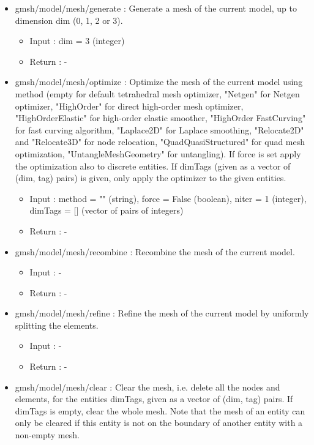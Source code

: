 \documentclass[dvipdfmx, 9pt, a4paper]{article}
\numberwithin{equation}{section}
\begin{document}
\begin{itemize}
\item gmsh/model/mesh/generate : Generate a mesh of the current model, up to dimension dim (0, 1, 2 or 3).
\begin{itemize}
\item Input : dim = 3 (integer)
\item Return : -
\end{itemize}
\item gmsh/model/mesh/optimize : Optimize the mesh of the current model using method (empty for default tetrahedral mesh optimizer, "Netgen" for Netgen optimizer, "HighOrder" for direct high-order mesh optimizer, "HighOrderElastic" for high-order elastic smoother, "HighOrder FastCurving" for fast curving algorithm, "Laplace2D" for Laplace smoothing, "Relocate2D" and "Relocate3D" for node relocation, "QuadQuasiStructured" for quad mesh optimization, "UntangleMeshGeometry" for untangling). If force is set apply the optimization also to discrete entities. If dimTags (given as a vector of (dim, tag) pairs) is given, only apply the optimizer to the given entities.
\begin{itemize}
\item Input : method = "" (string), force = False (boolean), niter = 1 (integer), dimTags = [] (vector of pairs of integers)
\item Return : -
\end{itemize}
\item gmsh/model/mesh/recombine : Recombine the mesh of the current model.
\begin{itemize}
\item Input : -
\item Return : -
\end{itemize}
\item gmsh/model/mesh/refine : Refine the mesh of the current model by uniformly splitting the elements.
\begin{itemize}
\item Input : -
\item Return : -
\end{itemize}
\item gmsh/model/mesh/clear : Clear the mesh, i.e. delete all the nodes and elements, for the entities dimTags, given as a vector of (dim, tag) pairs. If dimTags is empty, clear the whole mesh. Note that the mesh of an entity can only be cleared if this entity is not on the boundary of another entity with a non-empty mesh.
\begin{itemize}

\end{itemize}
\end{itemize}
\end{document}
